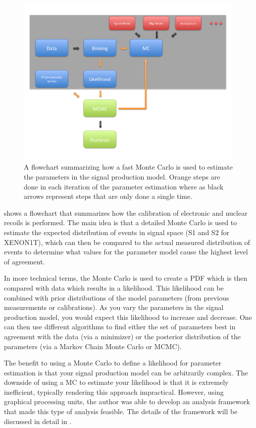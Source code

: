 \begin{figure}
        \centering
	\includegraphics[width=0.99\textwidth]{xe1t_fast_mc_flowchart}
	\caption{A flowchart summarizing how a fast Monte Carlo is used to estimate the parameters in the signal production model.  Orange steps are done in each iteration of the parameter estimation where as black arrows represent steps that are only done a single time.}
	\label{fig:xe1t_fast_mc_flowchart}
\end{figure}


 shows a flowchart that summarizes how the calibration of electronic and nuclear recoils is performed.  The main idea is that a detailed Monte Carlo is used to estimate the expected distribution of events in signal space (S1 and S2 for XENON1T), which can then be compared to the actual measured distribution of events to determine what values for the parameter model cause the highest level of agreement. 

In more technical terms, the Monte Carlo is used to create a PDF which is then compared with data which results in a likelihood.  This likelihood can be combined with prior distributions of the model parameters (from previous measurements or calibrations).  As you vary the parameters in the signal production model, you would expect this likelihood to increase and decrease.  One can then use different algorithms to find either the set of parameters best in agreement with the data (via a minimizer) or the posterior distribution of the parameters (via a Markov Chain Monte Carlo or MCMC).

The benefit to using a Monte Carlo to define a likelihood for parameter estimation is that your signal production model can be arbitrarily complex.  The downside of using a MC to estimate your likelihood is that it is extremely inefficient, typically rendering this approach impractical.  However, using graphical processing units, the author was able to develop an analysis framework that made this type of analysis feasible.  The details of the framework will be discussed in detail in .

